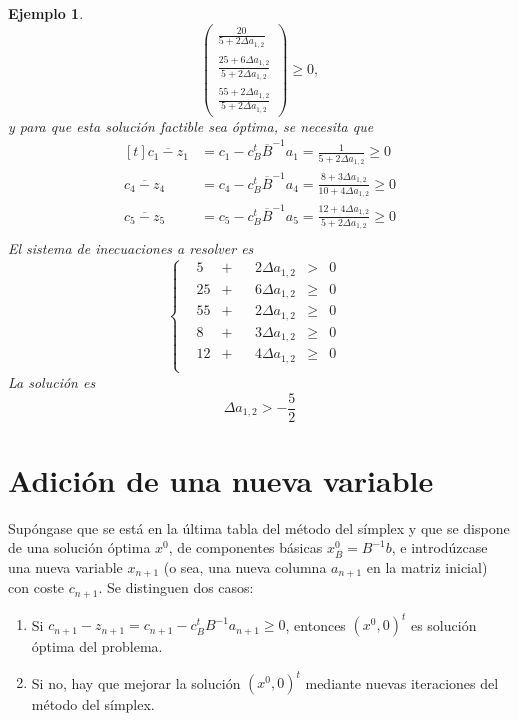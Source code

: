 \documentclass[11pt]{report}
\theoremstyle{mytheorem}
\theoremstyle{mydefinition}
\theoremstyle{myexample}
\newtheorem*{example}{Ejemplo}
\begin{document}
\begin{example}
\[\begin{pmatrix}
    \displaystyle\frac{20}{5+2\Delta a_{1,2}} \\[15pt]
    \displaystyle\frac{25+6\Delta a_{1,2}}{5+2\Delta a_{1,2}} \\[15pt]
    \displaystyle\frac{55+2\Delta a_{1,2}}{5+2\Delta a_{1,2}}
\end{pmatrix} \geq 0,\]
y para que esta solución factible sea óptima, se necesita que
\[\begin{aligned}[t]
\overline{c_1-z_1} &= c_1-c_B^t\overline{B}^{-1}a_1 = \frac{1}{5+2\Delta a_{1,2}} \geq 0 \\[5pt]
\overline{c_4-z_4} &= c_4-c_B^t\overline{B}^{-1}a_4 = \frac{8+3\Delta a_{1,2}}{10+4\Delta a_{1,2}} \geq 0 \\[5pt]
\overline{c_5-z_5} &= c_5-c_B^t\overline{B}^{-1}a_5 = \frac{12+4\Delta a_{1,2}}{5+2\Delta a_{1,2}} \geq 0 \\
\end{aligned}
\]
El sistema de inecuaciones a resolver es
\[\left\{\begin{alignedat}{10}
& 5  & {}+{} & &2\Delta a_{1,2} & {}>{} & 0& \\
& 25 & {}+{} & &6\Delta a_{1,2} & {}\geq{} & 0& \\
& 55 & {}+{} & &2\Delta a_{1,2} & {}\geq{} & 0& \\
& 8  & {}+{} & &3\Delta a_{1,2} & {}\geq{} & 0& \\
& 12 & {}+{} & &4\Delta a_{1,2} & {}\geq{} & 0& \\
\end{alignedat}\right.\]
La solución es \[\Delta a_{1,2} > -\frac{5}{2}\]
\end{example}

\section{Adición de una nueva variable}

Supóngase que se está en la última tabla del método del símplex y que se dispone de una solución óptima $x^0$, de componentes básicas $x^0_B = B^{-1}b$, e introdúzcase una nueva variable $x_{n+1}$ (o sea, una nueva columna $a_{n+1}$ en la matriz inicial) con coste $c_{n+1}$. Se distinguen dos casos:
\begin{enumerate}
    \item Si $c_{n+1}-z_{n+1} = c_{n+1}-c_B^tB^{-1}a_{n+1} \geq 0$, entonces $(x^0,0)^t$ es solución óptima del problema.
    \item Si no, hay que mejorar la solución $(x^0,0)^t$ mediante nuevas iteraciones del método del símplex.
\end{enumerate}
\end{document}
